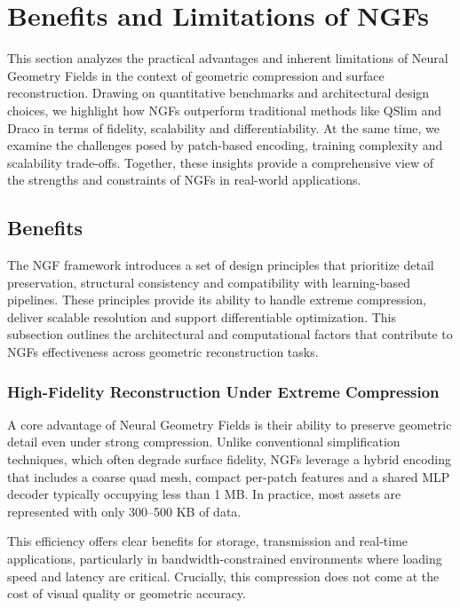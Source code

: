 \section{Benefits and Limitations of NGFs}\label{Sec:Evaluation}

This section analyzes the practical advantages and inherent limitations of Neural Geometry Fields in the context of geometric compression and surface reconstruction. 
Drawing on quantitative benchmarks and architectural design choices, we highlight how NGFs outperform traditional methods like QSlim and Draco in terms of fidelity, scalability and differentiability. 
At the same time, we examine the challenges posed by patch-based encoding, training complexity and scalability trade-offs. 
Together, these insights provide a comprehensive view of the strengths and constraints of NGFs in real-world applications.


\subsection{Benefits}

The NGF framework introduces a set of design principles that prioritize detail preservation, structural consistency and compatibility with learning-based pipelines. 
These principles provide its ability to handle extreme compression, deliver scalable resolution and support differentiable optimization. 
This subsection outlines the architectural and computational factors that contribute to NGFs effectiveness across geometric reconstruction tasks.

\subsubsection{High-Fidelity Reconstruction Under Extreme Compression}

A core advantage of Neural Geometry Fields is their ability to preserve geometric detail even under strong compression. 
Unlike conventional simplification techniques, which often degrade surface fidelity, NGFs leverage a hybrid encoding that includes a coarse quad mesh, compact per-patch features and a shared MLP decoder typically occupying less than 1 MB. 
In practice, most assets are represented with only 300--500 KB of data. 

This efficiency offers clear benefits for storage, transmission and real-time applications, particularly in bandwidth-constrained environments where loading speed and latency are critical. 
Crucially, this compression does not come at the cost of visual quality or geometric accuracy. 

